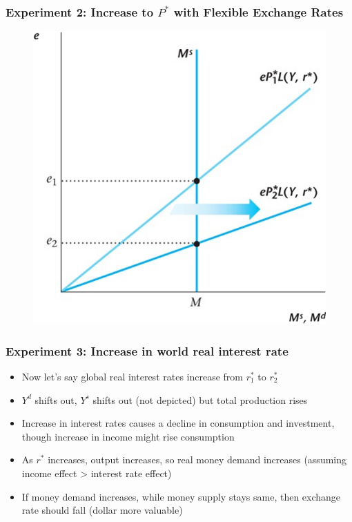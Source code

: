 \documentclass{beamer}
\begin{document}
\begin{frame}
\frametitle[alignment=center]{Experiment 2: Increase to $P^*$ with Flexible Exchange Rates}
\begin{figure}
\centering
\includegraphics[scale=0.73]{Figures/W_Fig_17pt5.png}
\end{figure}
\end{frame}

\begin{frame}
\frametitle[alignment=center]{Experiment 3: Increase in world real interest rate}
\begin{itemize}
\item Now let's say global real interest rates increase from $r_1^*$ to $r_2^*$
\bigskip
\item $Y^d$ shifts out, $Y^s$ shifts out (not depicted) but total production rises
\bigskip
\item Increase in interest rates causes a decline in consumption and investment, though increase in income might rise consumption
\bigskip
\item As $r^*$ increases, output increases, so real money demand increases (assuming income effect > interest rate effect)
\bigskip
\item If money demand increases, while money supply stays same, then exchange rate should fall (dollar more valuable)
\end{itemize}
\end{frame}
\end{document}
